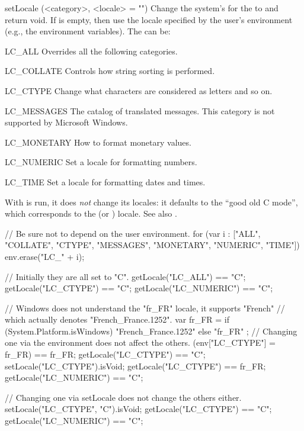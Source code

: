 \begin{urbiscriptapi}
\item[setLocale](<category>, <locale> = "")%
  Change the system's  for the  to 
  and return void.  If  is empty, then use the locale specified
  by the user's environment (e.g., the environment variables).  The
   can be:
  \begin{sublist}
    \begin{envs}
    \item[LC\_ALL] Overrides all the following categories.
    \item[LC\_COLLATE] Controls how string sorting is performed.
    \item[LC\_CTYPE] Change what characters are considered as letters and so
      on.
    \item[LC\_MESSAGES] The catalog of translated messages.  This category
      is not supported by Microsoft Windows.
    \item[LC\_MONETARY] How to format monetary values.
    \item[LC\_NUMERIC] Set a locale for formatting numbers.
    \item[LC\_TIME] Set a locale for formatting dates and times.
    \end{envs}
  \end{sublist}
  With  is run, it does \emph{not} change its locales: it
  defaults to the ``good old C mode'', which corresponds to the  (or
  ) locale.  See also .
\begin{urbicomment}
// Be sure not to depend on the user environment.
for (var i : ["ALL", "COLLATE", "CTYPE", "MESSAGES", "MONETARY",
              "NUMERIC", "TIME"])
  env.erase("LC_" + i);
\end{urbicomment}
\begin{urbiassert}
// Initially they are all set to "C".
getLocale("LC_ALL")     == "C";
getLocale("LC_CTYPE")   == "C";
getLocale("LC_NUMERIC") == "C";

// Windows does not understand the "fr_FR" locale, it supports "French"
// which actually denotes "French_France.1252".
var fr_FR =
  { if (System.Platform.isWindows) "French_France.1252" else "fr_FR" };
// Changing one via the environment does not affect the others.
(env["LC_CTYPE"] = fr_FR) == fr_FR;
getLocale("LC_CTYPE")   == "C";
setLocale("LC_CTYPE").isVoid;
getLocale("LC_CTYPE")   == fr_FR;
getLocale("LC_NUMERIC") == "C";

// Changing one via setLocale does not change the others either.
setLocale("LC_CTYPE", "C").isVoid;
getLocale("LC_CTYPE")   == "C";
getLocale("LC_NUMERIC") == "C";


\end{urbiassert}
\end{urbiscriptapi}
